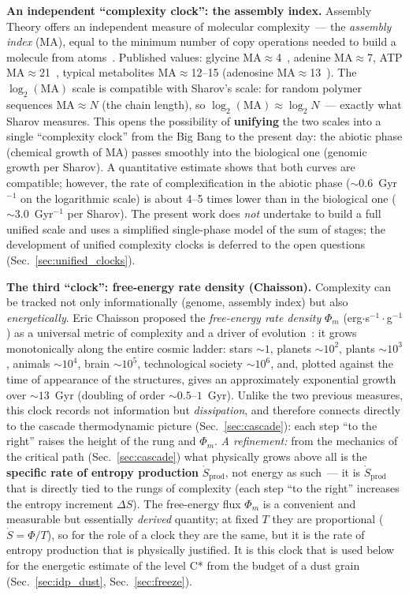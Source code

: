 \documentclass[11pt,a4paper]{article}
\begin{document}
\textbf{An independent ``complexity clock'': the assembly index.} Assembly Theory offers an independent measure of molecular complexity~--- the \emph{assembly index} (MA), equal to the minimum number of copy operations needed to build a molecule from atoms~\cite{Marshall2021,Cronin2023}. Published values: glycine MA$\approx$4~\cite{Marshall2021}, adenine MA$\approx$7, ATP MA$\approx$21~\cite{Mathis2021}, typical metabolites MA$\approx$12--15 (adenosine MA$\approx$13~\cite{Marshall2021}). The $\log_2(\mathrm{MA})$ scale is compatible with Sharov's scale: for random polymer sequences MA$\approx N$ (the chain length), so $\log_2(\mathrm{MA}) \approx \log_2 N$~--- exactly what Sharov measures. This opens the possibility of \textbf{unifying} the two scales into a single ``complexity clock'' from the Big Bang to the present day: the abiotic phase (chemical growth of MA) passes smoothly into the biological one (genomic growth per Sharov). A quantitative estimate shows that both curves are compatible; however, the rate of complexification in the abiotic phase ($\sim 0.6$~Gyr$^{-1}$ on the logarithmic scale) is about 4--5 times lower than in the biological one ($\sim 3.0$~Gyr$^{-1}$ per Sharov). The present work does \emph{not} undertake to build a full unified scale and uses a simplified single-phase model of the sum of stages; the development of unified complexity clocks is deferred to the open questions (Sec.~\ref{sec:unified_clocks}).

\textbf{The third ``clock'': free-energy rate density (Chaisson).} Complexity can be tracked not only informationally (genome, assembly index) but also \emph{energetically}. Eric Chaisson proposed the \emph{free-energy rate density} $\Phi_m$ (erg$\cdot$s$^{-1}\cdot$g$^{-1}$) as a universal metric of complexity and a driver of evolution~\cite{Chaisson2011}: it grows monotonically along the entire cosmic ladder: stars $\sim 1$, planets $\sim 10^2$, plants $\sim 10^3$, animals $\sim 10^4$, brain $\sim 10^5$, technological society $\sim 10^6$, and, plotted against the time of appearance of the structures, gives an approximately exponential growth over $\sim 13$~Gyr (doubling of order $\sim 0.5$--$1$~Gyr). Unlike the two previous measures, this clock records not information but \emph{dissipation}, and therefore connects directly to the cascade thermodynamic picture (Sec.~\ref{sec:cascade}): each step ``to the right'' raises the height of the rung and $\Phi_m$. \emph{A refinement:} from the mechanics of the critical path (Sec.~\ref{sec:cascade}) what physically grows above all is the \textbf{specific rate of entropy production} $\dot S_{\mathrm{prod}}$, not energy as such~--- it is $\dot S_{\mathrm{prod}}$ that is directly tied to the rungs of complexity (each step ``to the right'' increases the entropy increment $\Delta S$). The free-energy flux $\Phi_m$ is a convenient and measurable but essentially \emph{derived} quantity; at fixed $T$ they are proportional ($\dot S = \Phi/T$), so for the role of a clock they are the same, but it is the rate of entropy production that is physically justified. It is this clock that is used below for the energetic estimate of the level C* from the budget of a dust grain (Sec.~\ref{sec:idp_dust}, Sec.~\ref{sec:freeze}).
\end{document}
